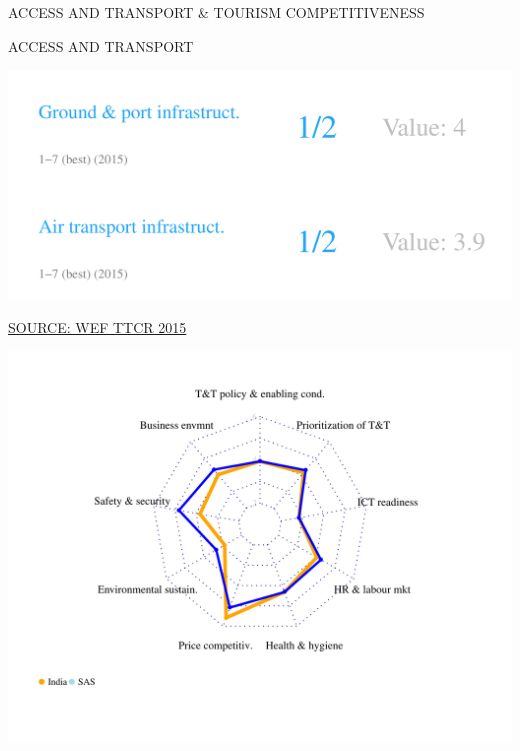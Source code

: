 \documentclass{article}\usepackage[]{graphicx}\usepackage[]{color}
\makeatletter
\def\maxwidth{ %
  \ifdim\Gin@nat@width>\linewidth
    \linewidth
  \else
    \Gin@nat@width
  \fi
}
\makeatother
\begin{document}
\begin{minipage}[c]{0.95\textwidth}
  \vspace{5ex}
  \begin{flushleft}  
    \hspace{4ex}\Large{\textcolor[HTML]{FF4023}{ACCESS AND TRANSPORT \& TOURISM COMPETITIVENESS}}\hspace{2ex}\small{\textcolor[HTML]{818181}{}}
  \end{flushleft}
  \begin{minipage}[c]{0.5\textwidth}
    \hspace{4ex}\small{\textcolor[HTML]{818181}{ACCESS AND TRANSPORT}}
    \vspace{1ex}


\hfill{}\includegraphics[width=\maxwidth]{figure/number4_1-1} 



    \hspace{4ex}\scriptsize{\href{NA}{\textcolor[HTML]{FF4023}{SOURCE: WEF TTCR 2015}}}
  \end{minipage}  
  \begin{minipage}[c]{0.5\textwidth}
    \hspace{4ex}\small{\textcolor[HTML]{818181}{}}
    \vspace{1ex}


\hfill{}\includegraphics[width=\maxwidth]{figure/radar3_1-1} 



  \hspace{4ex}\scriptsize{\href{NA}{\textcolor[HTML]{FF4023}{}}}
  \end{minipage}
\end{minipage}
\end{document}
